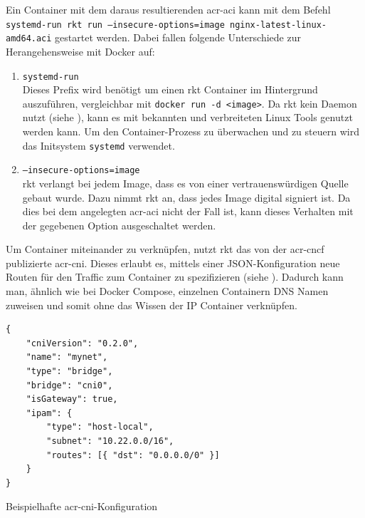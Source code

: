Ein Container mit dem daraus resultierenden \gls{acr-aci} kann mit dem Befehl \texttt{systemd-run rkt run --insecure-options=image nginx-latest-linux-amd64.aci} gestartet werden. Dabei fallen folgende Unterschiede zur Herangehensweise mit Docker auf:
\begin{enumerate}
	\item \texttt{systemd-run} \\ 
	Dieses Prefix wird benötigt um einen rkt Container im Hintergrund auszuführen, vergleichbar mit \texttt{docker run -d <image>}. Da rkt kein Daemon nutzt (siehe ), kann es mit bekannten und verbreiteten Linux Tools genutzt werden kann. Um den Container-Prozess zu überwachen und zu steuern wird das Initsystem \texttt{systemd} verwendet.
	\item \texttt{--insecure-options=image} \\
	rkt verlangt bei jedem Image, dass es von einer vertrauenswürdigen Quelle gebaut wurde. Dazu nimmt rkt an, dass jedes Image digital signiert ist. Da dies bei dem angelegten \gls{acr-aci} nicht der Fall ist, kann dieses Verhalten mit der gegebenen Option ausgeschaltet werden.
\end{enumerate}

Um Container miteinander zu verknüpfen, nutzt rkt das von der \gls{acr-cncf} publizierte \gls{acr-cni}. Dieses erlaubt es, mittels einer JSON-Konfiguration neue Routen für den Traffic zum Container zu spezifizieren (siehe ). Dadurch kann man, ähnlich wie bei Docker Compose, einzelnen Containern DNS Namen zuweisen und somit ohne das Wissen der IP Container verknüpfen.

\begin{listing}[h]
	\begin{verbatim}
{
	"cniVersion": "0.2.0",
	"name": "mynet",
	"type": "bridge",
	"bridge": "cni0",
	"isGateway": true,
	"ipam": {
		"type": "host-local",
		"subnet": "10.22.0.0/16",
		"routes": [{ "dst": "0.0.0.0/0" }]
	}
}
	\end{verbatim}
	\caption{Beispielhafte \gls{acr-cni}-Konfiguration}
	\label{lst:cniConfig}
\end{listing}

